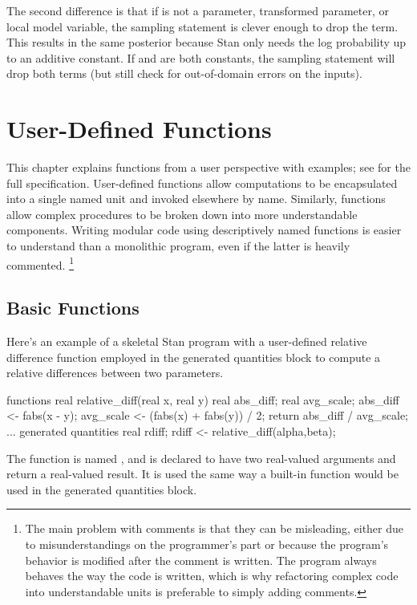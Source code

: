 The second difference is that if  is not a parameter,
transformed parameter, or local model variable, the sampling statement
is clever enough to drop the  term.  This results in
the same posterior because Stan only needs the log probability up to
an additive constant.  If  and  are both
constants, the sampling statement will drop both terms (but still
check for out-of-domain errors on the inputs).


\chapter{User-Defined Functions}\label{functions-programming.chapter}

\noindent
This chapter explains functions from a user perspective with examples;
see  for the full specification.  User-defined
functions allow computations to be encapsulated into a single named
unit and invoked elsewhere by name.  Similarly, functions allow
complex procedures to be broken down into more understandable
components.  Writing modular code using descriptively named functions
is easier to understand than a monolithic program, even if the latter
is heavily commented.%
%
\footnote{The main problem with comments is that they can be
  misleading, either due to misunderstandings on the programmer's part
  or because the program's behavior is modified after the comment is
  written.  The program always behaves the way the code is written,
  which is why refactoring complex code into understandable units is
  preferable to simply adding comments.}

\section{Basic Functions}\label{basic-functions.section}

Here's an example of a skeletal Stan program with a user-defined
relative difference function employed in the generated quantities
block to compute a relative differences between two parameters.
%
\begin{stancode}
functions {
  real relative_diff(real x, real y) {
    real abs_diff;
    real avg_scale;
    abs_diff <- fabs(x - y);
    avg_scale <- (fabs(x) + fabs(y)) / 2;
    return abs_diff / avg_scale;
  }
}
...
generated quantities {
  real rdiff;
  rdiff <- relative_diff(alpha,beta);
}
\end{stancode}
%
The function is named , and is declared to have
two real-valued arguments and return a real-valued result.   It is
used the same way a built-in function would be used in the generated
quantities block.

